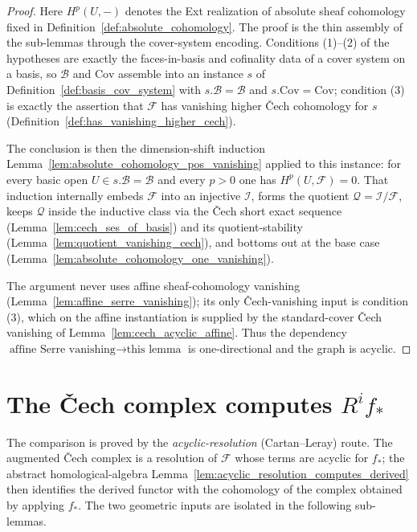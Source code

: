 \begin{proof}
    \leanok
  Here \(H^p(U, -)\) denotes the Ext realization of absolute sheaf cohomology fixed in
  Definition~\ref{def:absolute_cohomology}. The proof is the thin assembly of the sub-lemmas through
  the cover-system encoding. Conditions (1)--(2) of the hypotheses are exactly the faces-in-basis and
  cofinality data of a cover system on a basis, so \(\mathcal{B}\) and \(\mathrm{Cov}\) assemble into
  an instance \(s\) of Definition~\ref{def:basis_cov_system} with \(s.\mathcal{B} = \mathcal{B}\) and
  \(s.\mathrm{Cov} = \mathrm{Cov}\); condition (3) is exactly the assertion that \(\mathcal{F}\) has
  vanishing higher {\v C}ech cohomology for \(s\) (Definition~\ref{def:has_vanishing_higher_cech}).

  The conclusion is then the dimension-shift induction
  Lemma~\ref{lem:absolute_cohomology_pos_vanishing} applied to this instance: for every basic open
  \(U \in s.\mathcal{B} = \mathcal{B}\) and every \(p > 0\) one has \(H^p(U, \mathcal{F}) = 0\). That
  induction internally embeds \(\mathcal{F}\) into an injective \(\mathcal{I}\), forms the quotient
  \(\mathcal{Q} = \mathcal{I}/\mathcal{F}\), keeps \(\mathcal{Q}\) inside the inductive class via the
  {\v C}ech short exact sequence (Lemma~\ref{lem:cech_ses_of_basis}) and its quotient-stability
  (Lemma~\ref{lem:quotient_vanishing_cech}), and bottoms out at the base case
  (Lemma~\ref{lem:absolute_cohomology_one_vanishing}).

  The argument never uses affine sheaf-cohomology vanishing
  (Lemma~\ref{lem:affine_serre_vanishing}); its only {\v C}ech-vanishing input is condition (3),
  which on the affine instantiation is supplied by the standard-cover {\v C}ech vanishing of
  Lemma~\ref{lem:cech_acyclic_affine}. Thus the dependency
  \(\text{affine Serre vanishing} \to \text{this lemma}\) is one-directional and the graph is
  acyclic.
\end{proof}

\section{The {\v C}ech complex computes $R^i f_*$}

The comparison is proved by the \emph{acyclic-resolution} (Cartan--Leray) route. The
augmented {\v C}ech complex is a resolution of \(\mathcal{F}\) whose terms are
acyclic for \(f_*\); the abstract homological-algebra
Lemma~\ref{lem:acyclic_resolution_computes_derived} then identifies the derived
functor with the cohomology of the complex obtained by applying \(f_*\). The two
geometric inputs are isolated in the following sub-lemmas.

